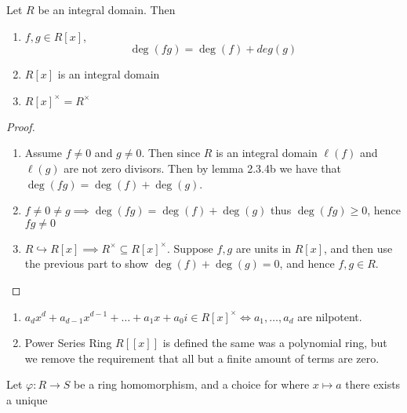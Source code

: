 \documentclass[master.tex]{subfiles}
\newcommand{\polyex}[2]{{#1}_#2 x^{#2} + {#1}_{#2-1}x^{#2-1} + \ldots + {#1}_1 x + {#1}_0}
\begin{document}
\begin{prop}
  Let \(R\) be an integral domain. Then
  \begin{enumerate}[label=(\alph*)]
  \item \(f,g \in R[x]\), \[\deg(fg)=\deg(f)+deg(g)\]
  \item \(R[x]\) is an integral domain
  \item \(R[x]^\times = R^\times\)
  \end{enumerate}
\end{prop}

\begin{proof}
  \begin{enumerate}[label=(\alph*)]
  \item Assume \(f \neq 0\) and \(g \neq 0\). Then since \(R\) is an integral domain \(\ell(f)\) and \(\ell(g)\) are not
    zero divisors. Then by lemma 2.3.4b we have that \(\deg(fg)=\deg(f)+\deg(g)\).
  \item \(f \neq 0 \neq g \implies \deg(fg)=\deg(f)+\deg(g)\) thus \(\deg(fg) \ge 0\), hence \(fg \neq 0\)
  \item \(R \hookrightarrow R[x] \implies R^\times \subseteq R[x]^\times\). Suppose \(f,g\) are units in \(R[x]\), and
    then use the previous part to show \(\deg(f)+\deg(g)=0\), and hence \(f,g \in R\).
  \end{enumerate}
\end{proof}

\begin{rmk}
  \begin{enumerate}
  \item \(\polyex{a}{d}{i} \in R[x]^\times \iff a_1, \ldots, a_d\) are nilpotent.
  \item Power Series Ring \(R[[x]]\) is defined the same was a polynomial ring, but we remove the requirement that all
    but a finite amount of terms are zero.
  \end{enumerate}
\end{rmk}

\begin{prop}
  Let \(\varphi \colon R \to S\) be a ring homomorphism, and a choice for where \(x \mapsto a\) there exists a unique
  \begin{figure}[h] \centering
  \end{figure}
\end{prop}
\end{document}
